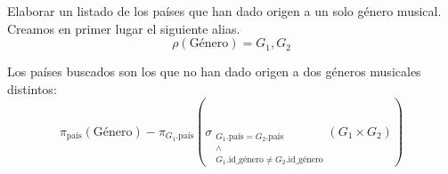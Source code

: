 \documentclass[12pt]{article}
\begin{document}
\begin{ejercicio}[AR]
    Elaborar un listado de los países que han dado origen a un solo género musical.\\

    Creamos en primer lugar el siguiente alias.
    \begin{equation*}
        \rho(\text{Género})=G_1,G_2
    \end{equation*}

    Los países buscados son los que no han dado origen a dos géneros musicales distintos:
    \begin{equation*}
        \pi_{\text{país}}(\text{Género})
        - \pi_{G_1.\text{país}}\left(\sigma_{\substack{G_1.\text{país}=G_2.\text{país}\\\land \\ G_1.\text{id\_género}\neq G_2.\text{id\_género}}}(G_1\times G_2)\right)
    \end{equation*}
\end{ejercicio}
\end{document}
